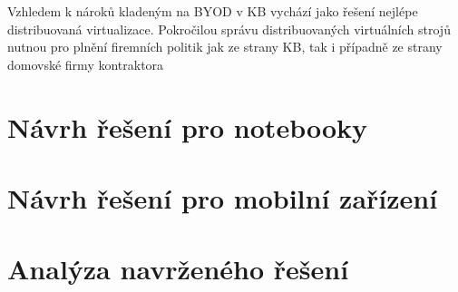 
Vzhledem k nároků kladeným na BYOD v KB vychází jako řešení nejlépe distribuovaná virtualizace. Pokročilou správu distribuovaných virtuálních strojů nutnou pro plnění firemních politik jak ze strany KB, tak i případně ze strany domovské firmy kontraktora 
\section{Návrh řešení pro notebooky}

\section{Návrh řešení pro mobilní zařízení}




\section{Analýza navrženého řešení}